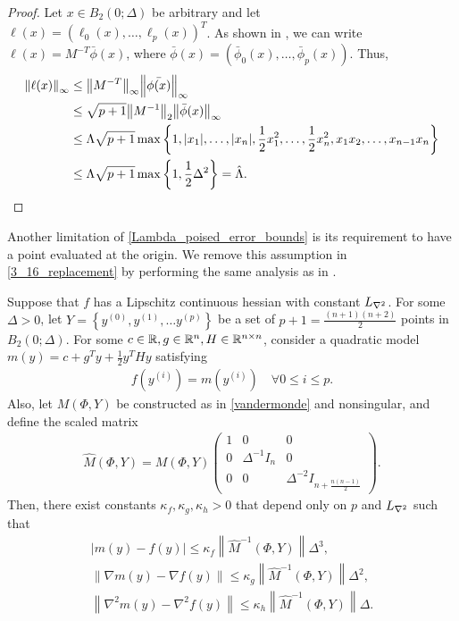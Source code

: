 \begin{proof}

Let $x \in B_2(0;\Delta)$ be arbitrary and let $\ell(x) = (\ell_0(x), \ldots, \ell_p(x))^T$.
As shown in \cite{introduction_book}, we can write $\ell(x) = M^{-T}\bar{\phi}(x)$, 
where $\bar{\phi}(x) = (\bar{\phi}_0(x), \ldots, \bar{\phi}_p(x))$.
Thus,
\begin{align*}
{\left\|\ell(x)\right\|}_{\infty} & \le {\left\|M^{-T}\right\|}_{\infty} {\left\|\bar{\phi(x)}\right\|}_{\infty} \\
& \le \sqrt{p+1} {\left\|M^{-1}\right\|}_2 {\left\|\bar{\phi}(x)\right\|}_{\infty} \\
& \le \Lambda \sqrt{p+1} \max\left\{1, |x_1|, \ldots,|x_n|, \frac 1 2 x_1^2, \ldots, \frac 1 2 x_n^2, x_1x_2, \ldots, x_{n-1}x_n\right\}\\
& \le \Lambda \sqrt{p+1}  \max\left\{1, \frac 1 2 \Delta^2\right\} = \hat{\Lambda}.
\end{align*}

\end{proof}


Another limitation of \cref{Lambda_poised_error_bounds} is its requirement to have a point evaluated at the origin.
We remove this assumption in \cref{3_16_replacement} by performing the same analysis as in \cite[Theorem 3.16]{introduction_book}.
\begin{theorem}
\label{3_16_replacement}
Suppose that $f$ has a Lipschitz continuous hessian with constant ${L_{\nabla^2}}$.
For some $\Delta > 0$, let $Y = \left\{y^{(0)}, y^{(1)}, \ldots y^{(p)} \right\}$ be a set of $p+1=\frac{(n+1)(n+2)}{2}$ points in
$B_2\left(0; \Delta\right)$.
For some $c \in \mathbb R, g \in \mathbb R^n, H \in \mathbb R^{n \times n}$, consider a quadratic model $m(y) = c + g^T y + \frac 1 2 y^T H y$  satisfying
\begin{align}
f\left(y^{(i)}\right) = m\left(y^{(i)}\right) \quad \forall 0 \le i \le p. \label{nce_interpolation_condition}
\end{align}
Also, let $M(\Phi,Y)$ be constructed as in \cref{vandermonde} and nonsingular, and define the scaled matrix
\begin{align}
\hat M(\Phi, Y) = M(\Phi,Y) \begin{pmatrix}
1 & 0 & 0 \\
0 & \Delta^{-1} I_n & 0 \\
0 & 0 & \Delta^{-2} I_{n + \frac{n(n-1)}{2}}
\end{pmatrix}. \label{nce_scale}
\end{align}
Then, there exist constants $\kappa_f, \kappa_g, \kappa_h>0$ that depend only on $p$ and ${L_{\nabla^2}}$ such that
\begin{align*}
\left|m(y) - f(y)\right| \le \kappa_f \left\|\hat M^{-1}(\Phi, Y) \right\| \Delta^3, \\
\left\|\nabla m(y) - \nabla f(y)\right\| \le \kappa_g \left\|\hat M^{-1}(\Phi, Y) \right\|\Delta^2, \\
\left\|\nabla^2 m(y) - \nabla^2 f(y)\right\| \le \kappa_h \left\|\hat M^{-1}(\Phi, Y) \right\|\Delta.
\end{align*}
\end{theorem}

